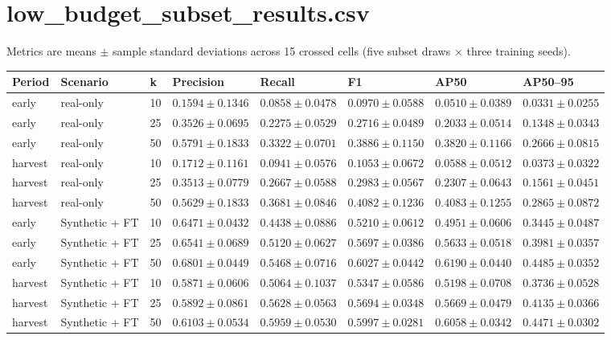 \documentclass{article}
\begin{document}
\section*{low\_budget\_subset\_results.csv}
Metrics are means $\pm$ sample standard deviations across 15 crossed cells (five subset draws $\times$ three training seeds).\par\medskip
\begin{lrbox}{\resulttable}\begin{tabular}{llllllll}
\toprule
Period & Scenario & k & Precision & Recall & F1 & AP50 & AP50--95 \\
\midrule
early & real-only & 10 & $0.1594 \pm 0.1346$ & $0.0858 \pm 0.0478$ & $0.0970 \pm 0.0588$ & $0.0510 \pm 0.0389$ & $0.0331 \pm 0.0255$ \\
early & real-only & 25 & $0.3526 \pm 0.0695$ & $0.2275 \pm 0.0529$ & $0.2716 \pm 0.0489$ & $0.2033 \pm 0.0514$ & $0.1348 \pm 0.0343$ \\
early & real-only & 50 & $0.5791 \pm 0.1833$ & $0.3322 \pm 0.0701$ & $0.3886 \pm 0.1150$ & $0.3820 \pm 0.1166$ & $0.2666 \pm 0.0815$ \\
harvest & real-only & 10 & $0.1712 \pm 0.1161$ & $0.0941 \pm 0.0576$ & $0.1053 \pm 0.0672$ & $0.0588 \pm 0.0512$ & $0.0373 \pm 0.0322$ \\
harvest & real-only & 25 & $0.3513 \pm 0.0779$ & $0.2667 \pm 0.0588$ & $0.2983 \pm 0.0567$ & $0.2307 \pm 0.0643$ & $0.1561 \pm 0.0451$ \\
harvest & real-only & 50 & $0.5629 \pm 0.1833$ & $0.3681 \pm 0.0846$ & $0.4082 \pm 0.1236$ & $0.4083 \pm 0.1255$ & $0.2865 \pm 0.0872$ \\
early & Synthetic + FT & 10 & $0.6471 \pm 0.0432$ & $0.4438 \pm 0.0886$ & $0.5210 \pm 0.0612$ & $0.4951 \pm 0.0606$ & $0.3445 \pm 0.0487$ \\
early & Synthetic + FT & 25 & $0.6541 \pm 0.0689$ & $0.5120 \pm 0.0627$ & $0.5697 \pm 0.0386$ & $0.5633 \pm 0.0518$ & $0.3981 \pm 0.0357$ \\
early & Synthetic + FT & 50 & $0.6801 \pm 0.0449$ & $0.5468 \pm 0.0716$ & $0.6027 \pm 0.0442$ & $0.6190 \pm 0.0440$ & $0.4485 \pm 0.0352$ \\
harvest & Synthetic + FT & 10 & $0.5871 \pm 0.0606$ & $0.5064 \pm 0.1037$ & $0.5347 \pm 0.0586$ & $0.5198 \pm 0.0708$ & $0.3736 \pm 0.0528$ \\
harvest & Synthetic + FT & 25 & $0.5892 \pm 0.0861$ & $0.5628 \pm 0.0563$ & $0.5694 \pm 0.0348$ & $0.5669 \pm 0.0479$ & $0.4135 \pm 0.0366$ \\
harvest & Synthetic + FT & 50 & $0.6103 \pm 0.0534$ & $0.5959 \pm 0.0530$ & $0.5997 \pm 0.0281$ & $0.6058 \pm 0.0342$ & $0.4471 \pm 0.0302$ \\
\bottomrule
\end{tabular}\end{lrbox}
\noindent\ifdim\wd\resulttable>\linewidth\resizebox{.99\linewidth}{!}{\usebox{\resulttable}}\else\usebox{\resulttable}\fi
\clearpage
\end{document}
